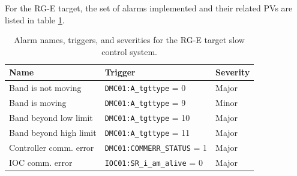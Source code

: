         For the RG-E target, the set of alarms implemented and their related PVs are listed in table \ref{tab::alarmspv}.

        \begin{table}[b!]
            \caption{Alarm names, triggers, and severities for the RG-E target slow control system.}

            \begin{center}
                \begin{tabularx}{360pt}{llX}
                    \hline
                    \textbf{Name}          & \textbf{Trigger}                     & \textbf{Severity} \\
                    \hline
                    Band is not moving     & \texttt{DMC01:A\_tgttype}       =  0 & Major             \\
                    Band is moving         & \texttt{DMC01:A\_tgttype}       =  9 & Minor             \\
                    Band beyond low limit  & \texttt{DMC01:A\_tgttype}       = 10 & Major             \\
                    Band beyond high limit & \texttt{DMC01:A\_tgttype}       = 11 & Major             \\
                    Controller comm. error & \texttt{DMC01:COMMERR\_STATUS}  =  1 & Major             \\
                    IOC comm. error        & \texttt{IOC01:SR\_i\_am\_alive} =  0 & Major             \\
                    \hline
                \end{tabularx}
                \label{tab::alarmspv}
            \end{center}
        \end{table}
